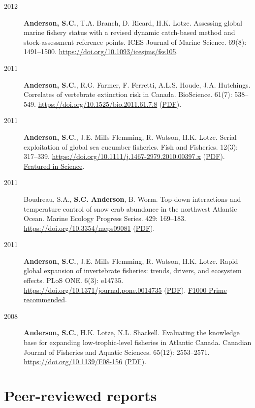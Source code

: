 \begin{description}
\item[2012]
\textbf{Anderson, S.C.}, T.A. Branch, D. Ricard, H.K. Lotze. Assessing
global marine fishery status with a revised dynamic catch-based method
and stock-assessment reference points. ICES Journal of Marine Science.
69(8): 1491--1500. \url{https://doi.org/10.1093/icesjms/fss105}.
\item[2011]
\textbf{Anderson, S.C.}, R.G. Farmer, F. Ferretti, A.L.S. Houde, J.A.
Hutchings. Correlates of vertebrate extinction risk in Canada.
BioScience. 61(7): 538--549.
\url{https://doi.org/10.1525/bio.2011.61.7.8}
(\href{https://www.dropbox.com/s/bt16dvi3idw3gdx/Anderson_etal_2011_BioScience_with_supplement.pdf?dl=1}{PDF}).
\item[2011]
\textbf{Anderson, S.C.}, J.E. Mills Flemming, R. Watson, H.K. Lotze.
Serial exploitation of global sea cucumber fisheries. Fish and
Fisheries. 12(3): 317--339.
\url{https://doi.org/10.1111/j.1467-2979.2010.00397.x}
(\href{https://www.dropbox.com/s/d8id4zxe9xv6jau/Anderson_etal_2011_seacucumbers_with_supplement.pdf?dl=1}{PDF}).
\href{http://www.sciencemag.org/content/331/6014/129.1.full}{Featured in
Science}.
\item[2011]
Boudreau, S.A., \textbf{S.C. Anderson}, B. Worm. Top-down interactions
and temperature control of snow crab abundance in the northwest Atlantic
Ocean. Marine Ecology Progress Series. 429: 169--183.
\url{https://doi.org/10.3354/meps09081}
(\href{http://www.int-res.com/articles/meps_oa/m429p169.pdf}{PDF}).
\item[2011]
\textbf{Anderson, S.C.}, J.E. Mills Flemming, R. Watson, H.K. Lotze.
Rapid global expansion of invertebrate fisheries: trends, drivers, and
ecosystem effects. PLoS ONE. 6(3): e14735.
\url{https://doi.org/10.1371/journal.pone.0014735}
(\href{http://www.plosone.org/article/fetchObject.action?uri=info\%3Adoi\%2F10.1371\%2Fjournal.pone.0014735\&representation=PDF}{PDF}).
\href{https://f1000.com/prime/9542957}{F1000 Prime recommended}.
\item[2008]
\textbf{Anderson, S.C.}, H.K. Lotze, N.L. Shackell. Evaluating the
knowledge base for expanding low-trophic-level fisheries in Atlantic
Canada. Canadian Journal of Fisheries and Aquatic Sciences. 65(12):
2553--2571. \url{https://doi.org/10.1139/F08-156}
(\href{https://www.dropbox.com/s/b0la81jbqitib6u/Anderson_etal_2008_knowledge.pdf?dl=1}{PDF}).
\end{description}

\hypertarget{peer-reviewed-reports}{%
\section{Peer-reviewed reports}\label{peer-reviewed-reports}}

